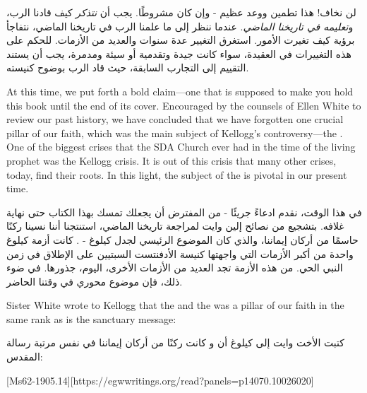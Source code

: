لن نخاف! هذا تطمين ووعد عظيم - وإن كان مشروطًا. يجب أن \textit{نتذكر} كيف قادنا الرب، و\textit{تعليمه في تاريخنا الماضي}. عندما ننظر إلى ما علمنا الرب في تاريخنا الماضي، نتفاجأ برؤية كيف تغيرت الأمور. استغرق التغيير عدة سنوات والعديد من الأزمات. للحكم على هذه التغييرات في العقيدة، سواء كانت جيدة وتقدمية أو سيئة ومدمرة، يجب أن يستند التقييم إلى التجارب السابقة، حيث قاد الرب بوضوح كنيسته.


At this time, we put forth a bold claim—one that is supposed to make you hold this book until the end of its cover. Encouraged by the counsels of Ellen White to review our past history, we have concluded that we have forgotten one crucial pillar of our faith, which was the main subject of Kellogg’s controversy—the . One of the biggest crises that the SDA Church ever had in the time of the living prophet was the Kellogg crisis. It is out of this crisis that many other crises, today, find their roots. In this light, the subject of the  is pivotal in our present time.


في هذا الوقت، نقدم ادعاءً جريئًا - من المفترض أن يجعلك تمسك بهذا الكتاب حتى نهاية غلافه. بتشجيع من نصائح إلين وايت لمراجعة تاريخنا الماضي، استنتجنا أننا نسينا ركنًا حاسمًا من أركان إيماننا، والذي كان الموضوع الرئيسي لجدل كيلوغ - . كانت أزمة كيلوغ واحدة من أكبر الأزمات التي واجهتها كنيسة الأدفنتست السبتيين على الإطلاق في زمن النبي الحي. من هذه الأزمة تجد العديد من الأزمات الأخرى، اليوم، جذورها. في ضوء ذلك، فإن موضوع  محوري في وقتنا الحاضر.


Sister White wrote to Kellogg that the  and the  was a pillar of our faith in the same rank as is the sanctuary message:


كتبت الأخت وايت إلى كيلوغ أن  و كانت ركنًا من أركان إيماننا في نفس مرتبة رسالة المقدس:


[Ms62-1905.14][https://egwwritings.org/read?panels=p14070.10026020]



